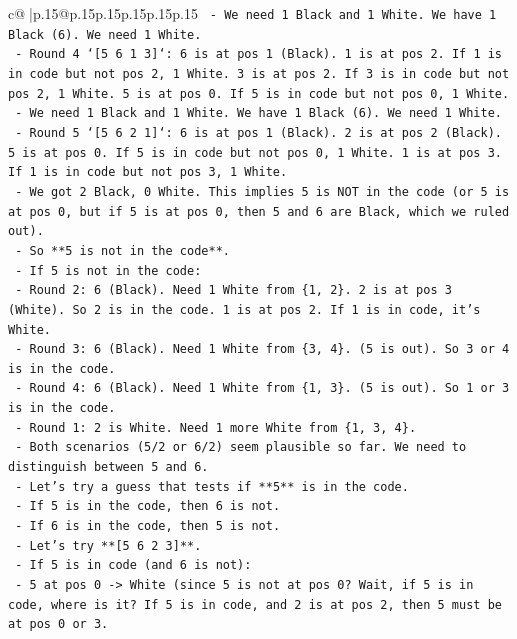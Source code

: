 \documentclass{article}
\begin{document}
{\begin{supertabular}{c@{$\;$}|p{.15\linewidth}@{}p{.15\linewidth}p{.15\linewidth}p{.15\linewidth}p{.15\linewidth}p{.15\linewidth}}
{{{\texttt{                {-} We need 1 Black and 1 White. We have 1 Black (6). We need 1 White.} \\
\texttt{                {-} Round 4 `{[}5 6 1 3{]}`: 6 is at pos 1 (Black). 1 is at pos 2. If 1 is in code but not pos 2, 1 White. 3 is at pos 2. If 3 is in code but not pos 2, 1 White. 5 is at pos 0. If 5 is in code but not pos 0, 1 White.} \\
\texttt{                {-} We need 1 Black and 1 White. We have 1 Black (6). We need 1 White.} \\
\texttt{                {-} Round 5 `{[}5 6 2 1{]}`: 6 is at pos 1 (Black). 2 is at pos 2 (Black). 5 is at pos 0. If 5 is in code but not pos 0, 1 White. 1 is at pos 3. If 1 is in code but not pos 3, 1 White.} \\
\texttt{                {-} We got 2 Black, 0 White. This implies 5 is NOT in the code (or 5 is at pos 0, but if 5 is at pos 0, then 5 and 6 are Black, which we ruled out).} \\
\texttt{                {-} So **5 is not in the code**.} \\
\texttt{                {-} If 5 is not in the code:} \\
\texttt{                    {-} Round 2: 6 (Black). Need 1 White from \{1, 2\}. 2 is at pos 3 (White). So 2 is in the code. 1 is at pos 2. If 1 is in code, it's White.} \\
\texttt{                    {-} Round 3: 6 (Black). Need 1 White from \{3, 4\}. (5 is out). So 3 or 4 is in the code.} \\
\texttt{                    {-} Round 4: 6 (Black). Need 1 White from \{1, 3\}. (5 is out). So 1 or 3 is in the code.} \\
\texttt{                    {-} Round 1: 2 is White. Need 1 more White from \{1, 3, 4\}.} \\
\texttt{            {-} Both scenarios (5/2 or 6/2) seem plausible so far. We need to distinguish between 5 and 6.} \\
\texttt{            {-} Let's try a guess that tests if **5** is in the code.} \\
\texttt{            {-} If 5 is in the code, then 6 is not.} \\
\texttt{            {-} If 6 is in the code, then 5 is not.} \\
\texttt{            {-} Let's try **{[}5 6 2 3{]}**.} \\
\texttt{                {-} If 5 is in code (and 6 is not):} \\
\texttt{                    {-} 5 at pos 0 {-}> White (since 5 is not at pos 0? Wait, if 5 is in code, where is it? If 5 is in code, and 2 is at pos 2, then 5 must be at pos 0 or 3.} \\
}}}
\end{supertabular}}
\end{document}
